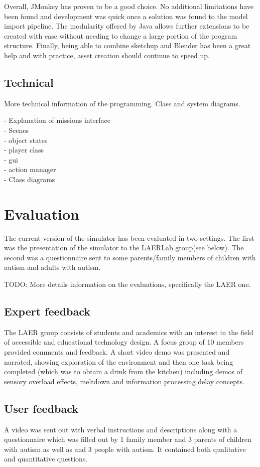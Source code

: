 \documentclass[11pt]{report}
\begin{document}
Overall, JMonkey has proven to be a good choice. No additional limitations have been found and development was quick once a solution was found to the model import pipeline. The modularity offered by Java allows
further extensions to be created with ease without needing to change a large portion of the program structure. Finally, being able to combine sketchup and Blender has been a great help and with practice, asset creation should
continue to speed up.

\subsection{Technical}
More technical information of the programming. Class and system diagrams.

- Explanation of missions interface \\
- Scenes\\
- object states\\
- player class\\
- gui\\
- action manager\\
- Class diagrams\\


\section{Evaluation}
The current version of the simulator has been evaluated in two settings. The first was the presentation of the simulator to the LAERLab group(see below). The second was a questionnaire sent to some parents/family members of children with autism and adults with autism.

TODO: More details information on the evaluations, specifically the LAER one.

\subsection{Expert feedback}
The LAER group consists of students and academics with an interest in the field of accessible and educational technology design. A focus group of 10 members provided comments and feedback. A short video demo was presented and narrated, showing exploration of the environment and then one task being completed (which was to obtain a drink from the kitchen) including demos of sensory overload effects, meltdown and information processing delay concepts.

\subsection{User feedback}
A video was sent out with verbal instructions and descriptions along with a questionnaire which was filled out by 1 family member and 3 parents of children with autism as well as and 3 people with autism. It contained both qualitative and quantitative questions.
\end{document}
